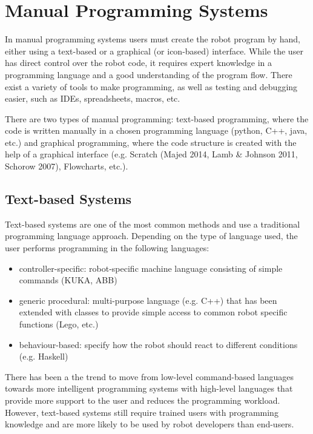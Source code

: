 \section{Manual Programming Systems}\label{subsec:Manual Programming Systems}
In manual programming systems users must create the robot program by hand, either using a text-based or a graphical (or icon-based) interface.
While the user has direct control over the robot code, it requires expert knowledge in a programming language and a good understanding of the program flow.
There exist a variety of tools to make programming, as well as testing and debugging easier, such as IDEs, spreadsheets, macros, etc.

There are two types of manual programming: text-based programming, where the code is written manually in a chosen programming language (python, C++, java, etc.) and graphical programming, where the code structure is created with the help of a graphical interface (e.g. Scratch (Majed 2014, Lamb \& Johnson 2011, Schorow 2007), Flowcharts, etc.). 

\subsection{Text-based Systems}\label{sssec:Text-based Systems}
Text-based systems are one of the most common methods and use a traditional programming language approach. 
Depending on the type of language used, the user performs programming in the following languages:
\begin{itemize}
	\item controller-specific: robot-specific machine language consisting of simple commands ({KUKA, ABB})
	\item generic procedural: multi-purpose language (e.g. C++) that has been extended with classes to provide simple access to common robot specific functions ({Lego, etc.})
	\item behaviour-based: specify how the robot should react to different conditions (e.g. Haskell)
\end{itemize}
There has been a the trend to move from low-level command-based languages towards more intelligent programming systems with high-level languages that provide more support to the user and  reduces the programming workload.
However, text-based systems still require trained users with programming knowledge and are more likely to be used by robot developers than end-users.


